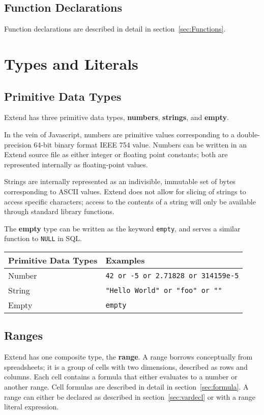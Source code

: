 	\subsection{Function Declarations}
		Function declarations are described in detail in section~\ref{sec:Functions}.
\section{Types and Literals}
	\subsection{Primitive Data Types}
		Extend has three primitive data types, \textbf{numbers}, \textbf{strings}, and \textbf{empty}.
		
		In the vein of Javascript, numbers are primitive values corresponding to a double-precision 64-bit binary format IEEE 754 value. Numbers can be written in an Extend source file as either integer or floating point constants; both are represented internally as floating-point values.
		
		Strings are internally represented as an indivisible, immutable set of bytes corresponding to ASCII values. Extend does not allow for slicing of strings to access specific characters; access to the contents of a string will only be available through standard library functions.

		The \textbf{empty} type can be written as the keyword \texttt{empty}, and serves a similar function to \texttt{NULL} in SQL.
		\newline
		\begin{table}[H]
		\centering
		\begin{tabular} {| l | l |}
			\hline
			\textbf{Primitive Data Types} & \textbf{Examples} \\ \hline
			Number & \texttt{42 or -5 or 2.71828 or 314159e-5} \\ \hline
			String & \texttt{"Hello World" or "foo" or ""} \\ \hline
			Empty & \texttt{empty} \\ \hline
		\end{tabular}
		\end{table}
	\subsection{Ranges}
		Extend has one composite type, the \textbf{range}. A range borrows conceptually from spreadsheets; it is a group of cells with two dimensions, described as rows and columns. Each cell contains a formula that either evaluates to a number or another range. Cell formulas are described in detail in section~\ref{sec:formula}. A range can either be declared as described in section~\ref{sec:vardecl} or with a range literal expression.
